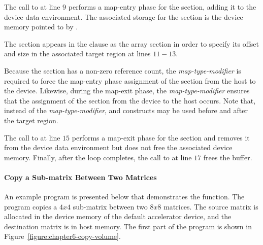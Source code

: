 The call to  at line $9$ performs a map-entry
phase for the section, adding it to the device data
environment.  The associated storage for the section is the device memory pointed
to by .

The section appears in the  clause as the array section  in order to
specify its offset and size in the associated target region at lines $11-13$.

Because the section has a non-zero reference count, the 
\emph{map-type-modifier} is required to force the map-entry phase assignment of the
section from the host to the device.
Likewise, during the map-exit phase,
the  \emph{map-type-modifier} ensures that the assignment of the
section from the device to the host occurs.
Note that, instead of the  \emph{map-type-modifier}, 
 and 
constructs may be used before and after the target region.

The call to  at line $15$ performs a 
map-exit phase for the section and removes it from
the device data environment but does not free the associated
device memory.
Finally, after the loop completes, the call to 
at line $17$ frees the  buffer. 

\paragraph{Copy a Sub-matrix Between Two Matrices}

An example program is presented below that demonstrates the 
 function. 
The program copies a $4x4$ sub-matrix between two $8x8$ matrices.  
The source matrix is allocated in the device memory of the
default accelerator device, and the destination matrix is in host memory.
The first part of the program is shown in Figure~\ref{figure:chapter6-copy-volume}.

